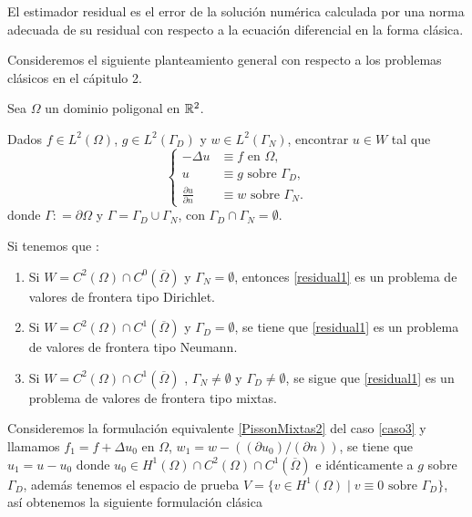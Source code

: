 El estimador residual es el error de la soluci\'on num\'erica calculada por una norma adecuada de su residual con respecto a la ecuaci\'on diferencial en la forma cl\'asica. 

Consideremos el siguiente planteamiento general con respecto a los problemas cl\'asicos en el c\'apitulo 2.  

Sea $\Omega$ un dominio poligonal en ${\mathbb{R}}^{2}$.

Dados $f\in L^{2}(\Omega)$, $g\in L^{2}(\Gamma_{D})$ y $w\in L^{2}(\Gamma_{N})$, encontrar $u\in W$ tal que 
\begin{equation}\label{residual1}
\left\{
\begin{aligned}
-\Delta u &\equiv f \text{ en  } \Omega,\\
u&\equiv g \text{ sobre } \Gamma_{D},\\
\frac{\partial u }{\partial n}& \equiv w \text{ sobre } \Gamma_{N}. 
\end{aligned}
\right.
\end{equation}
donde $\Gamma \colon =\partial \Omega$ y   $\Gamma = \Gamma_{D}\cup \Gamma_{N}$, con $\Gamma_{D}\cap \Gamma_{N}=\emptyset$. 

Si tenemos que :
\begin{enumerate}[{\rm (1)}]
	\item Si  $W= C^{2}(\Omega)\cap C^{0}(\overline{\Omega})$ y  $\Gamma_{N}=\emptyset$, entonces \eqref{residual1}  es un problema de valores de frontera tipo Dirichlet.\label{caso1}
	\item Si $W= C^{2}(\Omega)\cap C^{1}(\overline{\Omega})$ y  $\Gamma_{D}=\emptyset$, se tiene que \eqref{residual1}  es un problema de valores de frontera tipo Neumann.
	\item Si $W= C^{2}(\Omega)\cap C^{1}(\overline{\Omega})$ , $\Gamma_{N}\neq\emptyset$ y $\Gamma_{D}\neq\emptyset$, se sigue que \eqref{residual1} es un problema de valores de frontera tipo mixtas.\label{caso3}
\end{enumerate}
Consideremos la formulaci\'on equivalente \eqref{PissonMixtas2}  del  caso \eqref{caso3}   
y llamamos $f_{1}=f+\Delta u_{0}$ en $\Omega$, $w_{1}=w- ((\partial u_{0})/(\partial n)) $, se tiene que $u_{1}=u-u_{0}$ donde $u_{0}\in H^{1}(\Omega)\cap C^{2}(\Omega)\cap C^{1}(\overline{\Omega}) $ e id\'enticamente a $g$ sobre $\Gamma_{D}$, adem\'as tenemos el  espacio de prueba $V=\{ v\in H^{1}(\Omega) \mid v\equiv 0 \text{ sobre  } \Gamma_{D} \}$, as\'i obtenemos la siguiente formulaci\'on cl\'asica

